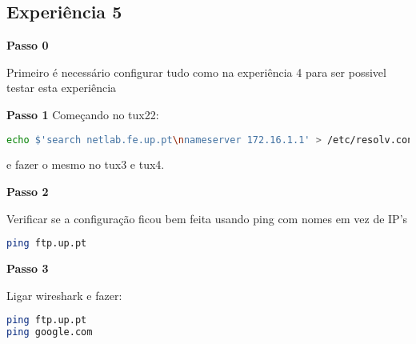 \subsection{Experiência 5} \label{exp5_steps}

\textbf{Passo 0}

Primeiro é necessário configurar tudo como na experiência 4 para ser possivel testar esta experiência

\textbf{Passo 1}
Começando no tux22:

\begin{lstlisting}[language=bash]
echo $'search netlab.fe.up.pt\nnameserver 172.16.1.1' > /etc/resolv.conf
\end{lstlisting}
e fazer o mesmo no tux3 e tux4.

\textbf{Passo 2}

Verificar se a configuração ficou bem feita usando ping com nomes em vez de IP's
\begin{lstlisting}[language=bash]
ping ftp.up.pt
\end{lstlisting}

\textbf{Passo 3}

Ligar wireshark e fazer:
\begin{lstlisting}[language=bash]
ping ftp.up.pt
ping google.com
\end{lstlisting}
